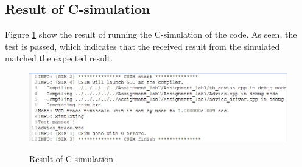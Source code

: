 \subsection{Result of C-simulation}
Figure \ref{fig:7_csim} show the result of running the C-simulation of the code. As seen, the test is passed, which indicates that the received result from the simulated matched the expected result.
\begin{figure}[b]
	\centering
	{\includegraphics[scale=0.5]{Images/2_7_csim.png}}\\[0.5cm]
	\label{fig:7_csim}
	\caption{Result of C-simulation}
\end{figure}

